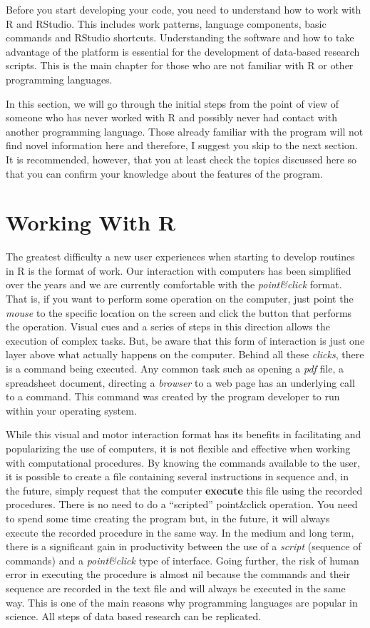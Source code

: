 \documentclass[11pt,]{book}
\begin{document}
Before you start developing your code, you need to understand how to
work with R and RStudio. This includes work patterns, language
components, basic commands and RStudio shortcuts. Understanding the
software and how to take advantage of the platform is essential for the
development of data-based research scripts. This is the main chapter for
those who are not familiar with R or other programming languages.

In this section, we will go through the initial steps from the point of
view of someone who has never worked with R and possibly never had
contact with another programming language. Those already familiar with
the program will not find novel information here and therefore, I
suggest you skip to the next section. It is recommended, however, that
you at least check the topics discussed here so that you can confirm
your knowledge about the features of the program.

\section{Working With R}\label{working-with-r}

The greatest difficulty a new user experiences when starting to develop
routines in R is the format of work. Our interaction with computers has
been simplified over the years and we are currently comfortable with the
\emph{point\&click} format. That is, if you want to perform some
operation on the computer, just point the \emph{mouse} to the specific
location on the screen and click the button that performs the operation.
Visual cues and a series of steps in this direction allows the execution
of complex tasks. But, be aware that this form of interaction is just
one layer above what actually happens on the computer. Behind all these
\emph{clicks}, there is a command being executed. Any common task such
as opening a \emph{pdf} file, a spreadsheet document, directing a
\emph{browser} to a web page has an underlying call to a command. This
command was created by the program developer to run within your
operating system.

While this visual and motor interaction format has its benefits in
facilitating and popularizing the use of computers, it is not flexible
and effective when working with computational procedures. By knowing the
commands available to the user, it is possible to create a file
containing several instructions in sequence and, in the future, simply
request that the computer \textbf{execute} this file using the recorded
procedures. There is no need to do a ``scripted'' point\&click
operation. You need to spend some time creating the program but, in the
future, it will always execute the recorded procedure in the same way.
In the medium and long term, there is a significant gain in productivity
between the use of a \emph{script} (sequence of commands) and a
\emph{point\&click} type of interface. Going further, the risk of human
error in executing the procedure is almost nil because the commands and
their sequence are recorded in the text file and will always be executed
in the same way. This is one of the main reasons why programming
languages are popular in science. All steps of data based research can
be replicated.
\end{document}
